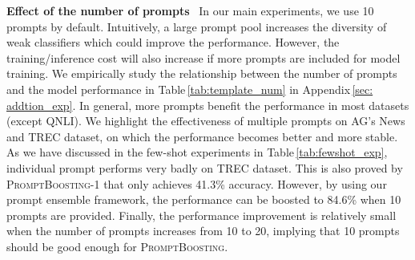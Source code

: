 \documentclass{article}
\theoremstyle{plain}
\theoremstyle{definition}
\theoremstyle{remark}
\newcommand{\alg}{\textsc{PromptBoosting}}
\begin{document}
\noindent \textbf{Effect of the number of prompts} \ 
In our main experiments, we use 10 prompts by default. Intuitively, a large prompt pool increases the diversity of weak classifiers which could improve the performance. However, the training/inference cost will also increase if more prompts are included for model training. We empirically study the relationship between the number of prompts and the model performance in Table\,\ref{tab:template_num} in Appendix\,\ref{sec: addtion_exp}. In general, more prompts benefit the performance in most datasets (except QNLI). We highlight the effectiveness of multiple prompts on AG's News and TREC dataset, on which the performance becomes better and more stable. As we have discussed in the few-shot experiments in Table\,\ref{tab:fewshot_exp}, individual prompt performs very badly on TREC dataset. This is also proved by {\alg}-1 that only achieves 41.3\% accuracy. However, by using our prompt ensemble framework, the performance can be boosted to 84.6\% when 10 prompts are provided. Finally, the performance improvement is relatively small when the number of prompts increases from 10 to 20, implying that 10 prompts should be good enough for {\alg}.
\end{document}

